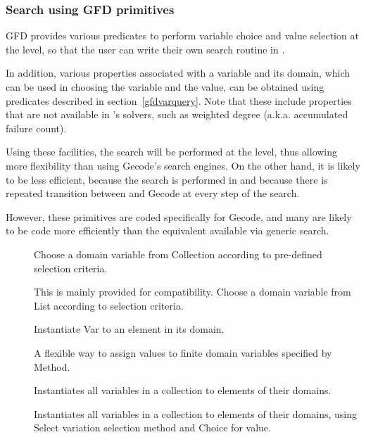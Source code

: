 \subsubsection{Search using GFD primitives}
\label{searchgfd}
GFD provides various predicates to perform variable choice
and value selection at the {\eclipse} level, so that the user can write their
own search routine in \eclipse. 

In addition, various properties associated
with a variable and its domain, which can be used in choosing the variable
and the value, can be obtained using predicates described
in section~\ref{gfdvarquery}. Note that these include properties that are not
available in
 \eclipse's solvers, such as weighted degree (a.k.a. accumulated failure count).

Using these facilities, the search will be performed
at the {\eclipse} level, thus allowing more flexibility than using Gecode's 
search engines. On the other hand, it is likely to be less efficient,
because the search is performed in \eclipse and because there is
repeated transition between {\eclipse} and Gecode at every step of the search.

However, these primitives are coded specifically for Gecode, and many are
likely to be code more efficiently than the equivalent available via 
generic search. 

\begin{description}
\item[]
Choose a domain variable from Collection according to pre-defined selection criteria.

\item[]
This is mainly provided for compatibility. Choose a domain variable from List according to selection criteria.

\item[]
Instantiate Var to an element in its domain.

\item[]
A flexible way to assign values to finite domain variables specified
 by Method.

\item[]
Instantiates all variables in a collection to elements of their domains.

\item[]
Instantiates all variables in a collection to elements of their domains, using 
Select variation selection method and Choice for value.
\end{description}

